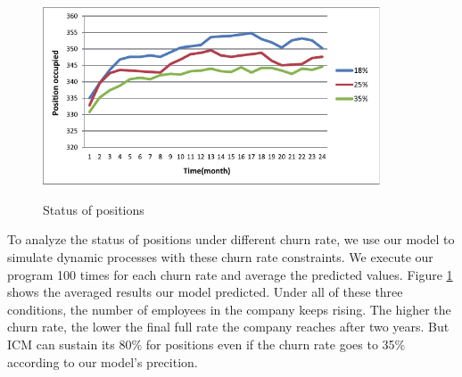 \documentclass[12pt,a4paper,titlepage]{article}
\begin{document}
\begin{figure}[htb]
  \centering
  \includegraphics[width=10cm]{task4_p.pdf}\\
  \caption{Status of positions}\label{t4_p}
\end{figure}

To analyze the status of positions under different churn rate, we use our model to simulate dynamic processes with these churn rate constraints. We execute our program 100 times for each churn rate and average the predicted values. Figure \ref{t4_p} shows the averaged results our model predicted. Under all of these three conditions, the number of employees in the company keeps rising. The higher the churn rate, the lower the final full rate the company reaches after two years. But ICM can sustain its 80\% for positions even if the churn rate goes to 35\% according to our model's precition.
\end{document}
